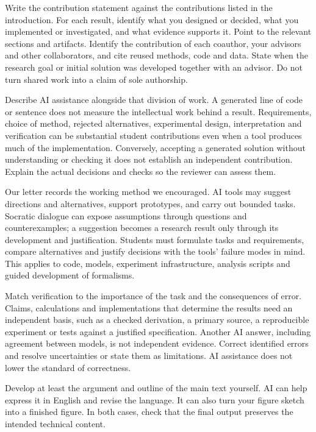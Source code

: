 Write the contribution statement against the contributions listed in the introduction. For each result, identify what you designed or decided, what you implemented or investigated, and what evidence supports it. Point to the relevant sections and artifacts. Identify the contribution of each coauthor, your advisors and other collaborators, and cite reused methods, code and data. State when the research goal or initial solution was developed together with an advisor. Do not turn shared work into a claim of sole authorship.

Describe AI assistance alongside that division of work. A generated line of code or sentence does not measure the intellectual work behind a result. Requirements, choice of method, rejected alternatives, experimental design, interpretation and verification can be substantial student contributions even when a tool produces much of the implementation. Conversely, accepting a generated solution without understanding or checking it does not establish an independent contribution. Explain the actual decisions and checks so the reviewer can assess them.

Our letter records the working method we encouraged. AI tools may suggest directions and alternatives, support prototypes, and carry out bounded tasks. Socratic dialogue can expose assumptions through questions and counterexamples; a suggestion becomes a research result only through its development and justification. Students must formulate tasks and requirements, compare alternatives and justify decisions with the tools' failure modes in mind. This applies to code, models, experiment infrastructure, analysis scripts and guided development of formalisms.

Match verification to the importance of the task and the consequences of error. Claims, calculations and implementations that determine the results need an independent basis, such as a checked derivation, a primary source, a reproducible experiment or tests against a justified specification. Another AI answer, including agreement between models, is not independent evidence. Correct identified errors and resolve uncertainties or state them as limitations. AI assistance does not lower the standard of correctness.

Develop at least the argument and outline of the main text yourself. AI can help express it in English and revise the language. It can also turn your figure sketch into a finished figure. In both cases, check that the final output preserves the intended technical content.

